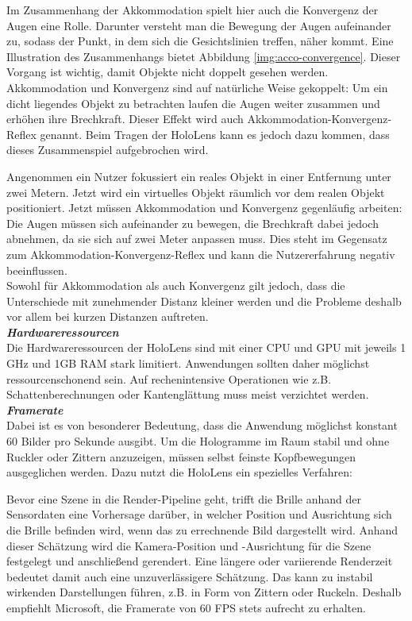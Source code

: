 \par
\noindent\hspace*{5mm}
Im Zusammenhang der Akkommodation spielt hier auch die Konvergenz der Augen eine Rolle. Darunter versteht man die Bewegung der Augen aufeinander zu, sodass der Punkt, in dem sich die Gesichtslinien treffen, näher kommt. Eine Illustration des Zusammenhangs bietet Abbildung \ref{img:acco-convergence}. Dieser Vorgang ist wichtig, damit Objekte nicht doppelt gesehen werden. Akkommodation und Konvergenz sind auf natürliche Weise gekoppelt: Um ein dicht liegendes Objekt zu betrachten laufen die Augen weiter zusammen und erhöhen ihre Brechkraft. Dieser Effekt wird auch Akkommodation-Konvergenz-Reflex genannt. Beim Tragen der HoloLens kann es jedoch dazu kommen, dass dieses Zusammenspiel aufgebrochen wird.
\par
\noindent\hspace*{5mm}
Angenommen ein Nutzer fokussiert ein reales Objekt in einer Entfernung unter zwei Metern. Jetzt wird ein virtuelles Objekt räumlich vor dem realen Objekt positioniert. Jetzt müssen Akkommodation und Konvergenz gegenläufig arbeiten: Die Augen müssen sich aufeinander zu bewegen, die Brechkraft dabei jedoch abnehmen, da sie sich auf zwei Meter anpassen muss. Dies steht im Gegensatz zum Akkommodation-Konvergenz-Reflex und kann die Nutzererfahrung negativ beeinflussen.\\

Sowohl für Akkommodation als auch Konvergenz gilt jedoch, dass die Unterschiede mit zunehmender Distanz kleiner werden und die Probleme deshalb vor allem bei kurzen Distanzen auftreten.\\

\textbf{\textit{Hardwareressourcen}}\\
Die Hardwareressourcen der HoloLens sind mit einer CPU und GPU mit jeweils 1 GHz und 1GB RAM stark limitiert. Anwendungen sollten daher möglichst ressourcenschonend sein. Auf rechenintensive Operationen wie z.B. Schattenberechnungen oder Kantenglättung muss meist verzichtet werden.\\

\textbf{\textit{Framerate}}\\
Dabei ist es von besonderer Bedeutung, dass die Anwendung möglichst konstant 60 Bilder pro Sekunde ausgibt. Um die Hologramme im Raum stabil und ohne Ruckler oder Zittern anzuzeigen, müssen selbst feinste Kopfbewegungen ausgeglichen werden. Dazu nutzt die HoloLens ein spezielles Verfahren:
\par
\noindent\hspace*{5mm}
Bevor eine Szene in die Render-Pipeline geht, trifft die Brille anhand der Sensordaten eine Vorhersage darüber, in welcher Position und Ausrichtung sich die Brille befinden wird, wenn das zu errechnende Bild dargestellt wird. Anhand dieser Schätzung wird die Kamera-Position und -Ausrichtung für die Szene festgelegt und anschließend gerendert. Eine längere oder variierende Renderzeit bedeutet damit auch eine unzuverlässigere Schätzung. Das kann zu instabil wirkenden Darstellungen führen, z.B. in Form von Zittern oder Ruckeln. Deshalb empfiehlt Microsoft, die Framerate von 60 FPS stets aufrecht zu erhalten.\\

